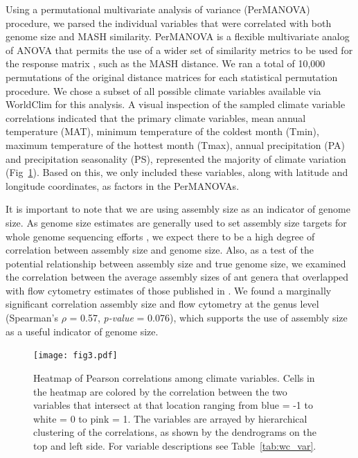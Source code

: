 \documentclass[fleqn,10pt,lineno]{wlpeerj} %
\begin{document}
Using a permutational multivariate analysis of variance (PerMANOVA)
procedure, we parsed the individual variables that were correlated
with both genome size and MASH similarity. PerMANOVA is a flexible
multivariate analog of ANOVA that permits the use of a wider set of
similarity metrics to be used for the response matrix
\citep{Anderson2001}, such as the MASH distance. We ran a total of
10,000 permutations of the original distance matrices for each
statistical permutation procedure. We chose a subset of all possible
climate variables available via WorldClim for this analysis. A visual
inspection of the sampled climate variable correlations indicated that
the primary climate variables, mean annual temperature (MAT), minimum
temperature of the coldest month (Tmin), maximum temperature of the
hottest month (Tmax), annual precipitation (PA) and precipitation
seasonality (PS), represented the majority of climate variation
(Fig~\ref{fig:clim_cor}). Based on this, we only included these
variables, along with latitude and longitude coordinates, as factors
in the PerMANOVAs.

It is important to note that we are using assembly size as an
indicator of genome size. As genome size estimates are generally used
to set assembly size targets for whole genome sequencing efforts
\citep{Hare2011}, we expect there to be a high degree of correlation
between assembly size and genome size. Also, as a test of the
potential relationship between assembly size and true genome size, we
examined the correlation between the average assembly sizes of ant
genera that overlapped with flow cytometry estimates of those
published in \citet{Tsutsui2008a}. We found a marginally significant
correlation assembly size and flow cytometry at the genus level
(Spearman's $\rho$ = 0.57, \textit{p-value} = 0.076), which supports
the use of assembly size as a useful indicator of genome size.


\begin{figure}[ht]
\texttt{[image: fig3.pdf]}
\caption{Heatmap of Pearson correlations among climate
  variables. Cells in the heatmap are colored by the correlation
  between the two variables that intersect at that location ranging
  from blue = -1 to white = 0 to pink = 1. The variables are arrayed
  by hierarchical clustering of the correlations, as shown by the
  dendrograms on the top and left side. For variable descriptions see
  Table~\ref{tab:wc_var}.}
\label{fig:clim_cor}
\end{figure}
\end{document}
